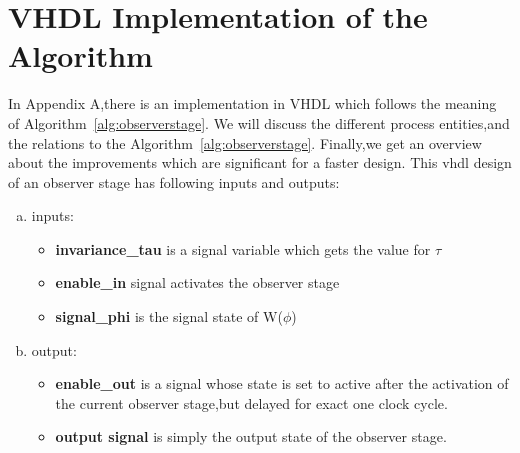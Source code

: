 \section{VHDL Implementation of the Algorithm}  
\label{chapter:sub:2}
In Appendix A,there is an implementation in VHDL which follows the meaning of Algorithm~\ref{alg:observerstage}.
We will discuss the different process entities,and the relations to the Algorithm~\ref{alg:observerstage}.
Finally,we get an overview about the improvements which are significant for a faster design. 
This vhdl design of an observer stage has following inputs and outputs:
\begin{enumerate}[(a)]
\item inputs:
\begin{itemize}
\item \textbf{invariance\_tau} is a signal variable which gets the value for $\tau$
\item \textbf{enable\_in} signal activates the observer stage
\item \textbf{signal\_phi} is the signal state of W($\phi$)
\end{itemize}
\newpage
\item output:
\begin{itemize}
\item \textbf{enable\_out} is a signal whose state is set to active after the activation of the current observer stage,but delayed for exact one clock cycle.   
\item \textbf{output signal} is simply the output state of the observer stage.
\end{itemize}
\end{enumerate}

